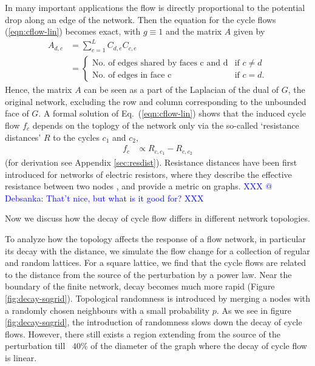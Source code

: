 \documentclass[10pt,aps,pra,twocolumn,superscriptaddress]{revtex4-1}
\newcommand{\dirk}[1]{\textcolor{blue}{#1}}
\begin{document}
In many important applications the flow is directly proportional to the
potential drop along an edge of the network.
Then the equation for the cycle flows (\ref{eqn:cflow-lin}) becomes exact,
with $g \equiv 1$ and the matrix $A$ given by 
\begin{align}
   \label{eqn:lin-Lapldef}
   A_{d,c} &= \sum_{e=1}^L C_{d,e} C_{c,e} \\
           &=
	     \begin{cases}
	     \text{No. of edges shared by faces c and d} & \text{if } c\neq d\\
	     \text{No. of edges in face c} & \text{if } c=d.
	     \end{cases}
    \nonumber	     
\end{align}
Hence, the matrix $A$ can be seen as a part of the Laplacian of the dual  
of $G$, the original network, excluding the row and column corresponding to 
the unbounded face of $G$. A formal solution of Eq.~(\ref{eqn:cflow-lin}) 
shows that the induced cycle flow $f_c$ depends on the toplogy of the 
network only via the so-called `resistance distances' $R$ to the cycles
$c_1$ and $c_2$,
\begin{align}
    \label{eq:fc-resdist}
   f_c &\propto R_{c,c_1}-R_{c,c_2}
\end{align}
(for derivation see Appendix \ref{sec:resdist}).
Resistance distances have been first introduced for networks of electric resistors,
where they describe the effective resistance between two nodes \cite{Klei93},
and provide a metric on graphs.
\dirk{XXX @ Debsanka: That't nice, but what is it good for? XXX}

Now we discuss how the decay of cycle flow differs in different network 
topologies.  

To analyze how the topology affects the response of a flow network, in particular
its decay with the distance, we simulate the flow change for a collection of regular and 
random lattices. 
For a square lattice, we find that the cycle flows are related to the 
distance from the source of the perturbation by a power law. Near the boundary of the finite
network, decay becomes much more rapid (Figure \ref{fig:decay-sqgrid}). 
Topological randomness is introduced by merging a nodes with a randomly chosen 
neighbours with a small probability $p$.  As we see in figure \ref{fig:decay-sqgrid}, the 
introduction of randomness slows down the decay of cycle flows.  
However, there still exists a 
region extending from the source of the perturbation till ~$40$\% of the 
diameter of the graph where the decay of cycle flow is linear.  
\end{document}
